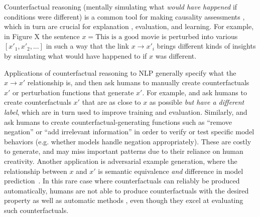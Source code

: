 Counterfactual reasoning (mentally simulating what \emph{would have happened} if conditions were different) is a common tool for making causality assessments \cite{kahneman}, which in turn are crucial for explanation \cite{miller}, evaluation, and learning. For example, in Figure X the sentence $x = \text{This is a good movie}$ is perturbed into various $[x'_1, x'_2, ...]$ in such a way that the link $x \rightarrow x'_i$ brings different kinds of insights by simulating what would have happened to if $x$ was different.

Applications of counterfactual reasoning to NLP generally specify what the $x \rightarrow x'$ relationship is, and then ask humans to manually create counterfactuals $x'$ or perturbation functions that generate $x'$.
For example, \citet{gardner2020contrast} and \citet{kaushik2019learning} ask humans to create counterfactuals $x'$ that are as close to $x$ as possible \emph{but have a different label}, which are in turn used to improve training and evaluation. Similarly, \citet{wu2019errudite} and \citet{checklist:acl20} ask humans to create counterfactual-generating functions such as ``remove negation'' or ``add irrelevant information'' in order to verify or test specific model behaviors (e.g. whether models handle negation appropriately).
These are costly to generate, and may miss important patterns due to their reliance on human creativity.
Another application is adversarial example generation, where the relationship between $x$ and $x'$ is semantic equivalence \emph{and} difference in model prediction~\cite{iyyer2018adversarial, ribeiro2018semantically}. In this rare case where counterfactuals can reliably be produced automatically, humans are not able to produce counterfactuals with the desired property as well as automatic methods  \cite{ribeiro2018semantically}, even though they excel at evaluating such counterfactuals.

